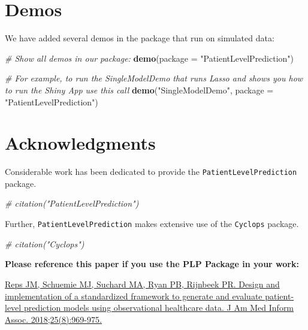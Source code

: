 \documentclass[]{book}
\newenvironment{Shaded}{\begin{snugshade}}{\end{snugshade}}
\newcommand{\KeywordTok}[1]{\textcolor[rgb]{0.13,0.29,0.53}{\textbf{#1}}}
\newcommand{\DataTypeTok}[1]{\textcolor[rgb]{0.13,0.29,0.53}{#1}}
\newcommand{\StringTok}[1]{\textcolor[rgb]{0.31,0.60,0.02}{#1}}
\newcommand{\CommentTok}[1]{\textcolor[rgb]{0.56,0.35,0.01}{\textit{#1}}}
\newcommand{\NormalTok}[1]{#1}
\begin{document}
\section{Demos}\label{demos}

We have added several demos in the package that run on simulated data:

\begin{Shaded}
\begin{Highlighting}[]
\CommentTok{# Show all demos in our package: }
 \KeywordTok{demo}\NormalTok{(}\DataTypeTok{package =} \StringTok{"PatientLevelPrediction"}\NormalTok{)}

\CommentTok{# For example, to run the SingleModelDemo that runs Lasso and shows you how to run the Shiny App use this call}
 \KeywordTok{demo}\NormalTok{(}\StringTok{"SingleModelDemo"}\NormalTok{, }\DataTypeTok{package =} \StringTok{"PatientLevelPrediction"}\NormalTok{)}
\end{Highlighting}
\end{Shaded}

\newpage

\section{Acknowledgments}\label{acknowledgments}

Considerable work has been dedicated to provide the
\texttt{PatientLevelPrediction} package.

\begin{Shaded}
\begin{Highlighting}[]
\CommentTok{# citation("PatientLevelPrediction")}
\end{Highlighting}
\end{Shaded}

Further, \texttt{PatientLevelPrediction} makes extensive use of the
\texttt{Cyclops} package.

\begin{Shaded}
\begin{Highlighting}[]
\CommentTok{# citation("Cyclops")}
\end{Highlighting}
\end{Shaded}

\textbf{Please reference this paper if you use the PLP Package in your
work:}

\href{http://dx.doi.org/10.1093/jamia/ocy032}{Reps JM, Schuemie MJ,
Suchard MA, Ryan PB, Rijnbeek PR. Design and implementation of a
standardized framework to generate and evaluate patient-level prediction
models using observational healthcare data. J Am Med Inform Assoc.
2018;25(8):969-975.}
\end{document}
